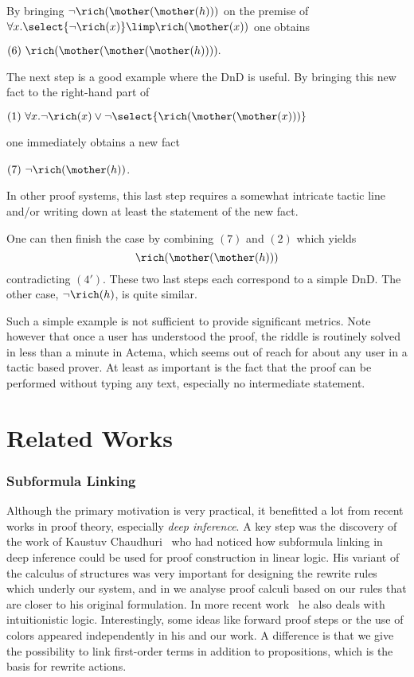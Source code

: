 By bringing 
$\neg\rich(\mother(\mother(h)))$ on the premise of $\forall
x. \select{\neg\rich(x)} \limp \rich(\mother(x))$
one obtains

\medskip
$(6) ~\rich(\mother(\mother(\mother(h)))).$
\medskip

The next step is a good example where the DnD is useful. By bringing
this new fact to the right-hand part of

\medskip
$(1)~\forall x. \neg\rich(x)\lor \neg\select{\rich(\mother(\mother(x)))}$
\medskip

\noindent
one immediately obtains a new fact

\medskip
$(7) ~\neg{\rich(\mother(h))}$.
\medskip

\noindent In other proof systems, this last step requires a somewhat intricate
tactic line and/or writing down at least the statement of the new fact.

One can then finish the case by combining $(7)$ and $(2)$ which yields
$$\rich(\mother(\mother(h)))$$ contradicting $(4')$. These two last steps each
correspond to a simple DnD. The other case, $\neg\rich(h)$, is quite similar.

Such a simple example is not sufficient to provide significant
metrics. Note however that once a user has understood the proof, the
riddle is routinely solved in less than a minute in Actema, which
seems out of reach for about any user in a tactic based prover. At
least as important is the fact that the proof can be performed without
typing any text, especially no intermediate statement. 


\section{Related Works}


\subsubsection*{Subformula Linking}

Although the primary motivation is very practical, it benefitted a lot from
recent works in proof theory, especially \emph{deep inference}. A key step was
the discovery of the work of Kaustuv Chaudhuri~\cite{Chaudhuri2013} who had
noticed how subformula linking in deep inference could be used for proof
construction in linear logic. His variant of the calculus of structures was very
important for designing the rewrite rules which underly our system, and in
 we analyse proof calculi based on our rules that are closer to his
original formulation. In more recent work~\cite{DBLP:conf/cade/Chaudhuri21} he
also deals with intuitionistic logic. Interestingly, some ideas like forward
proof steps or the use of colors appeared independently in his and our work. A
difference is that we give the possibility to link first-order terms in addition
to propositions, which is the basis for rewrite actions.



